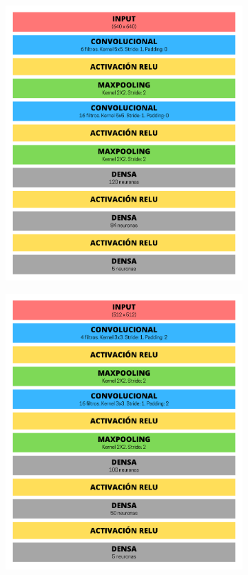\begin{figure}[!t]
\centering
\begin{subfigure}[t]{0.45\textwidth}
  \includegraphics[width=\textwidth]{img/estructura_Basica.png}
\end{subfigure}
\begin{subfigure}[t]{0.45\textwidth}
  \includegraphics[width=\textwidth]{img/estructura_Mobeen.png}
\end{subfigure}


\end{figure}
